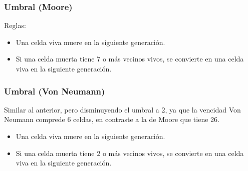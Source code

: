\subsubsection{Umbral (Moore)}
Reglas:
\begin{itemize}
    \item Una celda viva muere en la siguiente generación.
    \item Si una celda muerta tiene 7 o más vecinos vivos, se convierte en una celda viva en la siguiente generación.
\end{itemize}

\subsubsection{Umbral (Von Neumann)}
Similar al anterior, pero disminuyendo el umbral a 2, ya que la vencidad Von Neumann comprede 6 celdas, en contraste a la de Moore que tiene 26.
\begin{itemize}
    \item Una celda viva muere en la siguiente generación.
    \item Si una celda muerta tiene 2 o más vecinos vivos, se convierte en una celda viva en la siguiente generación.
\end{itemize}


